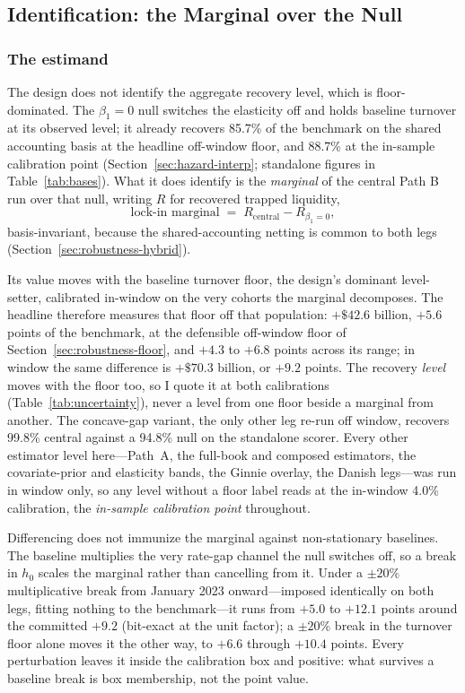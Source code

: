 \subsection{Identification: the Marginal over the Null}\label{sec:identification}

\subsubsection{The estimand}

The design does not identify the aggregate recovery level, which is floor-dominated. The $\beta_1 = 0$ null switches the elasticity off and holds baseline turnover at its observed level; it already recovers 85.7\% of the benchmark on the shared accounting basis at the headline off-window floor, and 88.7\% at the in-sample calibration point (Section~\ref{sec:hazard-interp}; standalone figures in Table~\ref{tab:bases}). What it does identify is the \emph{marginal} of the central Path B run over that null, writing $R$ for recovered trapped liquidity,
\begin{equation}\label{eq:marginal}
\text{lock-in marginal} \;=\; R_{\text{central}} - R_{\beta_1 = 0},
\end{equation}
basis-invariant, because the shared-accounting netting is common to both legs (Section~\ref{sec:robustness-hybrid}).

Its value moves with the baseline turnover floor, the design's dominant level-setter, calibrated in-window on the very cohorts the marginal decomposes. The headline therefore measures that floor off that population: $+\$42.6$ billion, $+5.6$ points of the benchmark, at the defensible off-window floor of Section~\ref{sec:robustness-floor}, and $+4.3$ to $+6.8$ points across its range; in window the same difference is $+\$70.3$ billion, or $+9.2$ points. The recovery \emph{level} moves with the floor too, so I quote it at both calibrations (Table~\ref{tab:uncertainty}), never a level from one floor beside a marginal from another. The concave-gap variant, the only other leg re-run off window, recovers 99.8\% central against a 94.8\% null on the standalone scorer. Every other estimator level here---Path~A, the full-book and composed estimators, the covariate-prior and elasticity bands, the Ginnie overlay, the Danish legs---was run in window only, so any level without a floor label reads at the in-window 4.0\% calibration, the \emph{in-sample calibration point} throughout.

Differencing does not immunize the marginal against non-stationary baselines. The baseline multiplies the very rate-gap channel the null switches off, so a break in $h_0$ scales the marginal rather than cancelling from it. Under a $\pm 20\%$ multiplicative break from January 2023 onward---imposed identically on both legs, fitting nothing to the benchmark---it runs from $+5.0$ to $+12.1$ points around the committed $+9.2$ (bit-exact at the unit factor); a $\pm 20\%$ break in the turnover floor alone moves it the other way, to $+6.6$ through $+10.4$ points. Every perturbation leaves it inside the calibration box and positive: what survives a baseline break is box membership, not the point value.

